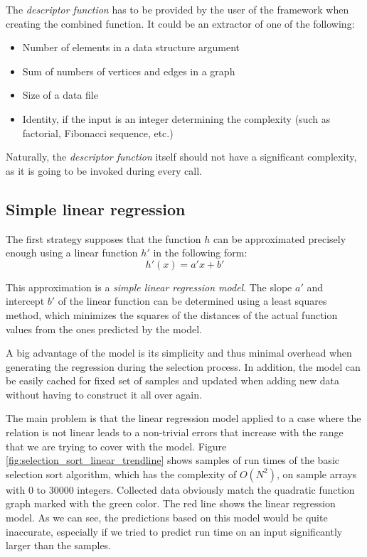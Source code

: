 The \textit{descriptor function} has to be provided by the user of the framework when creating the combined function. It could be an extractor of one of the following:
\begin{itemize}
	\item Number of elements in a data structure argument
	\item Sum of numbers of vertices and edges in a graph
	\item Size of a data file
	\item Identity, if the input is an integer determining the complexity (such as factorial, Fibonacci sequence, etc.)
\end{itemize}
Naturally, the \textit{descriptor function} itself should not have a significant complexity, as it is going to be invoked during every call.

\subsection{Simple linear regression}
\label{subsec:simple_linear_regression}

The first strategy supposes that the function \(h\) can be approximated precisely enough using a linear function \(h'\) in the following form:
\[h'(x) = a' x + b'\]

This approximation is a \textit{simple linear regression model}. The slope \(a'\) and intercept \(b'\) of the linear function can be determined using a least squares method, which minimizes the squares of the distances of the actual function values from the ones predicted by the model.

A big advantage of the model is its simplicity and thus minimal overhead when generating the regression during the selection process. In addition, the model can be easily cached for fixed set of samples and updated when adding new data without having to construct it all over again.

The main problem is that the linear regression model applied to a case where the relation is not linear leads to a non-trivial errors that increase with the range that we are trying to cover with the model. Figure \ref{fig:selection_sort_linear_trendline} shows samples of run times of the basic selection sort algorithm, which has the complexity of \(O(N^2)\), on sample arrays with 0 to 30000 integers. Collected data obviously match the quadratic function graph marked with the green color. The red line shows the linear regression model. As we can see, the predictions based on this model would be quite inaccurate, especially if we tried to predict run time on an input significantly larger than the samples.

